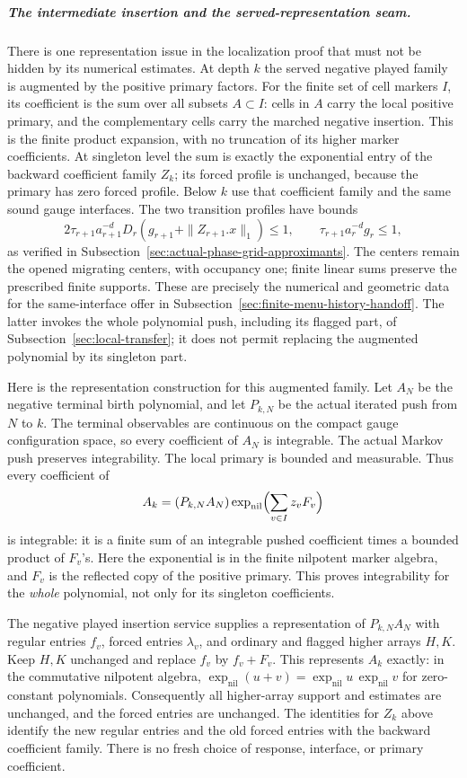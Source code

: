 \subparagraph{The intermediate insertion and the served-representation seam.}
There is one representation issue in the localization proof that must
not be hidden by its numerical estimates. At depth $k$ the served
negative played family is augmented by the positive primary factors.
For the finite set of cell markers $I$, its coefficient is the sum over
all subsets $A\subset I$: cells in $A$ carry the local positive primary,
and the complementary cells carry the marched negative insertion.
This is the finite product expansion, with no truncation of its higher
marker coefficients. At singleton level the sum is exactly the
exponential entry of the backward coefficient family $Z_k$; its forced profile is
unchanged, because the primary has zero forced profile.
Below $k$ use that coefficient family and the same sound gauge interfaces. The two
transition profiles have bounds
\[
 2\tau_{r+1}a_{r+1}^{-d}D_r
       (g_{r+1}+\|Z_{r+1}.x\|_1)\le1,
 \qquad \tau_{r+1}a_r^{-d}g_r\le1,
\]
as verified in Subsection~\ref{sec:actual-phase-grid-approximants}.
The centers remain the opened migrating centers, with occupancy one;
finite linear sums preserve the prescribed finite supports. These are
precisely the numerical and geometric data for the same-interface offer in
Subsection~\ref{sec:finite-menu-history-handoff}. The latter invokes the
whole polynomial push, including its flagged part, of
Subsection~\ref{sec:local-transfer}; it does not permit replacing the
augmented polynomial by its singleton part.

Here is the representation construction for this augmented family.
Let $A_N$ be the negative terminal birth polynomial, and let $P_{k,N}$
be the actual iterated push from $N$ to $k$. The terminal observables are
continuous on the compact gauge configuration space, so every coefficient
of $A_N$ is integrable. The actual Markov push preserves integrability.
The local primary is bounded and measurable. Thus every coefficient of
\[
 A_k=(P_{k,N}A_N)\exp_{\mathrm{nil}}
                  \Bigl(\sum_{v\in I}z_v F_v\Bigr)
\]
is integrable: it is a finite sum of an integrable pushed coefficient
times a bounded product of $F_v$'s. Here the exponential is in the
finite nilpotent marker algebra, and $F_v$ is the reflected copy of the
positive primary. This proves integrability for the \emph{whole}
polynomial, not only for its singleton coefficients.

The negative played insertion service supplies a representation of
$P_{k,N}A_N$ with regular entries $f_v$, forced entries $\lambda_v$,
and ordinary and flagged higher arrays $H,K$. Keep $H,K$ unchanged
and replace $f_v$ by $f_v+F_v$. This represents $A_k$ exactly:
in the commutative nilpotent algebra,
$\exp_{\mathrm{nil}}(u+v)=\exp_{\mathrm{nil}}u\,
\exp_{\mathrm{nil}}v$ for zero-constant polynomials. Consequently all
higher-array support and estimates are unchanged, and the forced
entries are unchanged. The identities for $Z_k$ above identify the new
regular entries and the old forced entries with the backward coefficient family.
There is no fresh choice of response, interface, or primary coefficient.

